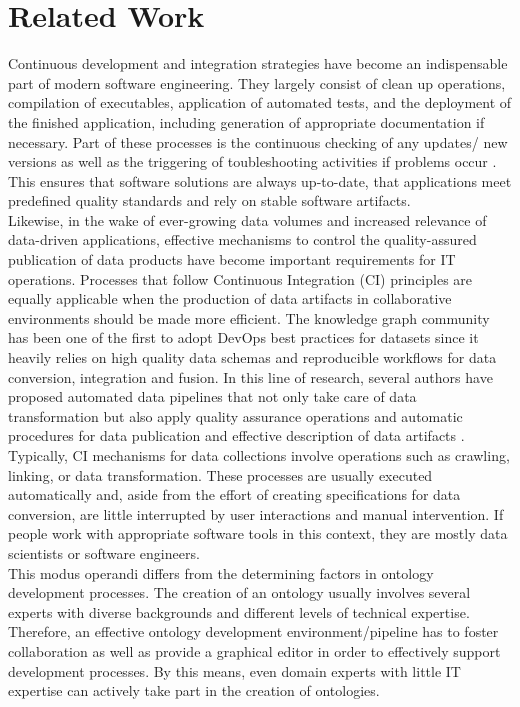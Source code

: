 \documentclass[sigconf]{acmart}
\begin{document}
\section{Related Work}
Continuous development and integration strategies have become an indispensable part of modern software engineering.
They largely consist of clean up operations, compilation of executables, application of automated tests, and the deployment of the finished application, including generation of appropriate documentation if necessary. Part of these processes is the continuous checking of any updates/ new versions as well as the triggering of toubleshooting activities if problems occur \cite{fowler}.
This ensures that software solutions are always up-to-date, that applications meet predefined quality standards and rely on stable software artifacts.\\
Likewise, in the wake of ever-growing data volumes and increased relevance of data-driven applications, effective mechanisms to control the quality-assured publication of data products have become important requirements for IT operations. Processes that follow Continuous Integration (CI) principles are equally applicable when the production of data artifacts in collaborative environments should be made more efficient. The knowledge graph community has been one of the first to adopt DevOps best practices for datasets since it heavily relies on high quality data schemas and reproducible workflows for data conversion, integration and fusion. In this line of research, several authors have proposed automated data pipelines that not only take care of data transformation but also apply quality assurance operations and automatic procedures for data publication and effective description of data artifacts
\cite{cirulli, klimek, kucera, meissner, rojas, roman, stadler, dataid}. Typically, CI mechanisms for data collections involve operations such as crawling, linking, or data transformation. These processes are usually executed automatically and, aside from the effort of creating specifications for data conversion, are little interrupted by user interactions and manual intervention. If people work with appropriate software tools in this context, they are mostly data scientists or software engineers.\\
This modus operandi differs from the determining factors in ontology development processes. The creation of an ontology usually involves several experts with diverse backgrounds and different levels of technical expertise. Therefore, an effective ontology development environment/pipeline has to foster collaboration as well as provide a graphical editor in order to effectively support development processes. By this means, even domain experts with little IT expertise can actively take part in the creation of ontologies.\\
\end{document}
